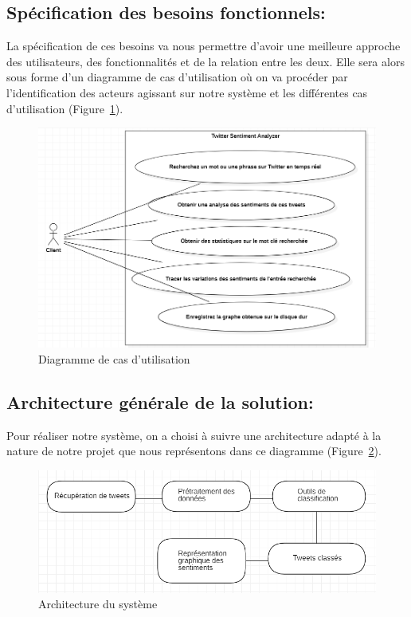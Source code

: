 \subsection{Spécification des besoins fonctionnels:}
La spécification de ces besoins va nous permettre d’avoir une meilleure approche des utilisateurs, des fonctionnalités et de la relation entre les deux. Elle sera alors sous forme d'un diagramme de cas d’utilisation où on va procéder par l'identification des acteurs agissant sur notre système et les différentes cas d'utilisation (Figure~\ref{fig:usecases}).
\begin{figure}
    \centering
    \includegraphics[width=\textwidth]{etude-theorique-conception/assets/useCase.png}
    \caption{Diagramme de cas d'utilisation}
    \label{fig:usecases}
\end{figure}

\subsection{Architecture générale de la solution:}
Pour réaliser notre système, on a choisi à suivre une architecture adapté à la nature de notre projet que nous représentons dans ce diagramme (Figure~\ref{fig:projettwitterarchitecture}).
\begin{figure}
    \centering
    \includegraphics[width=\textwidth]{etude-theorique-conception/assets/architecture.png}
    \caption{Architecture du système}
    \label{fig:projettwitterarchitecture}
\end{figure}

